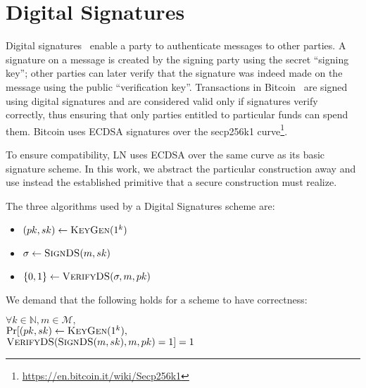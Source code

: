 \section{Digital Signatures}
\label{sec:ds}
  Digital signatures~\cite{katzlindell} enable a party to authenticate messages
  to other parties. A signature on a message is created by the signing party
  using the secret ``signing key''; other parties can later verify that the
  signature was indeed made on the message using the public ``verification
  key''. Transactions in Bitcoin~\cite{bitcoin} are signed using digital
  signatures and are considered valid only if signatures verify correctly, thus
  ensuring that only parties entitled to particular funds can spend them.
  Bitcoin uses ECDSA signatures over the secp256k1
  curve\footnote{\url{https://en.bitcoin.it/wiki/Secp256k1}}.

  To ensure compatibility, LN uses ECDSA over the same curve as its basic
  signature scheme. In this work, we abstract the particular construction away
  and use instead the established primitive that a secure construction must
  realize.

  The three algorithms used by a Digital Signatures scheme are:
  \begin{itemize}
    \item $(pk, sk) \gets \textsc{KeyGen}(1^k)$
    \item $\sigma \gets \textsc{SignDS}(m, sk)$
    \item $\{0, 1\} \gets \textsc{VerifyDS}(\sigma, m, pk)$
  \end{itemize}

  We demand that the following holds for a scheme to have correctness:

  $\forall k \in \mathbb{N}, m \in \mathcal{M},$ \\
  $\Pr[(pk, sk) \gets \textsc{KeyGen}(1^k),$ \\
  $\textsc{VerifyDS}(\textsc{SignDS}(m, sk), m, pk) = 1] = 1$

